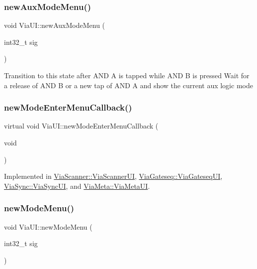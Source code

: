 \subsubsection{\texorpdfstring{new\+Aux\+Mode\+Menu()}{newAuxModeMenu()}}
{\footnotesize\ttfamily void Via\+U\+I\+::new\+Aux\+Mode\+Menu (\begin{DoxyParamCaption}\item[{int32\+\_\+t}]{sig }\end{DoxyParamCaption})}

Transition to this state after A\+ND A is tapped while A\+ND B is pressed Wait for a release of A\+ND B or a new tap of A\+ND A and show the current aux logic mode \mbox{\label{class_via_u_i_a2ebd72eaa0d26437d2c6320eb5fdf3e4}} 
\subsubsection{\texorpdfstring{new\+Mode\+Enter\+Menu\+Callback()}{newModeEnterMenuCallback()}}
{\footnotesize\ttfamily virtual void Via\+U\+I\+::new\+Mode\+Enter\+Menu\+Callback (\begin{DoxyParamCaption}\item[{void}]{ }\end{DoxyParamCaption})\hspace{0.3cm}{\ttfamily [pure virtual]}}



Implemented in \mbox{\hyperlink{class_via_scanner_1_1_via_scanner_u_i_a15124d20f2684fd9c5d1c83d41a15e5a}{Via\+Scanner\+::\+Via\+Scanner\+UI}}, \mbox{\hyperlink{class_via_gateseq_1_1_via_gateseq_u_i_a7ced8ac998979d31b1f0a617edba8490}{Via\+Gateseq\+::\+Via\+Gateseq\+UI}}, \mbox{\hyperlink{class_via_sync_1_1_via_sync_u_i_a553b539840029324ea43feb128f4b2c9}{Via\+Sync\+::\+Via\+Sync\+UI}}, and \mbox{\hyperlink{class_via_meta_1_1_via_meta_u_i_a6adf1a02d1e513a13727982347ecbe72}{Via\+Meta\+::\+Via\+Meta\+UI}}.

\mbox{\label{class_via_u_i_ac0e9dd4f7b102c712e14d9ee062dcaf7}} 
\subsubsection{\texorpdfstring{new\+Mode\+Menu()}{newModeMenu()}}
{\footnotesize\ttfamily void Via\+U\+I\+::new\+Mode\+Menu (\begin{DoxyParamCaption}\item[{int32\+\_\+t}]{sig }\end{DoxyParamCaption})}

